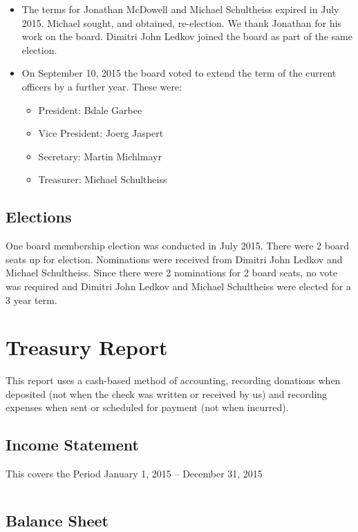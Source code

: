 \documentclass[letterpaper]{report}
\begin{document}
\begin{itemize} \item The terms for Jonathan McDowell and Michael
Schultheiss expired in July 2015.  Michael sought, and obtained,
re-election.  We thank Jonathan for his work on the board.  Dimitri John
Ledkov joined the board as part of the same election.

\item On September 10, 2015 the board voted to extend the term of the
current officers by a further year. These were:
\begin{itemize}
\item President: Bdale Garbee
\item Vice President: Joerg Jaspert
\item Secretary: Martin Michlmayr
\item Treasurer: Michael Schultheiss
\end{itemize}
\end{itemize}

\section{Elections}

One board membership election was conducted in July 2015.  There were 2
board seats up for election.  Nominations were received from Dimitri
John Ledkov and Michael Schultheiss.  Since there were 2 nominations for
2 board seats, no vote was required and Dimitri John Ledkov and Michael
Schultheiss were elected for a 3 year term.

\chapter{Treasury Report}

This report uses a cash-based method of accounting, recording donations when
deposited (not when the check was written or received by us) and recording
expenses when sent or scheduled for payment (not when incurred).

\section{Income Statement}

This covers the Period January 1, 2015 -- December 31, 2015

\begin{verbatim}
\end{verbatim}

\section{Balance Sheet}
\end{document}
